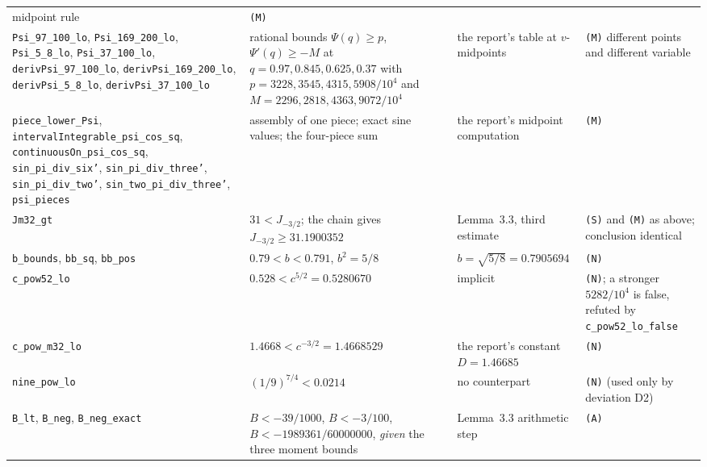 \documentclass[11pt]{article}
\newcommand{\Ln}[1]{\texttt{#1}}
\newcommand{\No}{\texttt{(N)}}
\newcommand{\Sc}{\texttt{(S)}}
\newcommand{\Me}{\texttt{(M)}}
\newcommand{\As}{\texttt{(A)}}
\begin{document}
{\begin{longtable}{L{3.7cm}L{4.2cm}L{3.4cm}L{4.7cm}}
midpoint rule & \Me\\
\Ln{Psi\_\allowbreak{}97\_\allowbreak{}100\_\allowbreak{}lo}, \Ln{Psi\_\allowbreak{}169\_\allowbreak{}200\_\allowbreak{}lo}, \Ln{Psi\_\allowbreak{}5\_\allowbreak{}8\_\allowbreak{}lo}, \Ln{Psi\_\allowbreak{}37\_\allowbreak{}100\_\allowbreak{}lo},
\Ln{derivPsi\_\allowbreak{}97\_\allowbreak{}100\_\allowbreak{}lo}, \Ln{derivPsi\_\allowbreak{}169\_\allowbreak{}200\_\allowbreak{}lo}, \Ln{derivPsi\_\allowbreak{}5\_\allowbreak{}8\_\allowbreak{}lo},
\Ln{derivPsi\_\allowbreak{}37\_\allowbreak{}100\_\allowbreak{}lo} & rational bounds $\Psi(q)\ge p$, $\Psi'(q)\ge-M$ at
$q=0.97,0.845,0.625,0.37$ with $p=3228,3545,4315,5908/10^4$ and $M=2296,2818,4363,9072/10^4$ &
the report's table at $v$-midpoints & \Me{} different points and different variable\\
\Ln{piece\_\allowbreak{}lower\_\allowbreak{}Psi}, \Ln{intervalIntegrable\_\allowbreak{}psi\_\allowbreak{}cos\_\allowbreak{}sq},
\Ln{continuousOn\_\allowbreak{}psi\_\allowbreak{}cos\_\allowbreak{}sq}, \Ln{sin\_\allowbreak{}pi\_\allowbreak{}div\_\allowbreak{}six'}, \Ln{sin\_\allowbreak{}pi\_\allowbreak{}div\_\allowbreak{}three'},
\Ln{sin\_\allowbreak{}pi\_\allowbreak{}div\_\allowbreak{}two'}, \Ln{sin\_\allowbreak{}two\_\allowbreak{}pi\_\allowbreak{}div\_\allowbreak{}three'}, \Ln{psi\_\allowbreak{}pieces} & assembly of one
piece; exact sine values; the four-piece sum & the report's midpoint computation & \Me\\
\Ln{Jm32\_\allowbreak{}gt} & $31<J_{-3/2}$; the chain gives $J_{-3/2}\ge31.1900352$ & Lemma~3.3, third
estimate & \Sc{} and \Me{} as above; conclusion identical\\
\Ln{b\_\allowbreak{}bounds}, \Ln{bb\_\allowbreak{}sq}, \Ln{bb\_\allowbreak{}pos} & $0.79<b<0.791$, $b^2=5/8$ & $b=\sqrt{5/8}=0.7905694$
& \No\\
\Ln{c\_\allowbreak{}pow52\_\allowbreak{}lo} & $0.528<c^{5/2}=0.5280670$ & implicit & \No; a stronger $5282/10^4$ is false,
refuted by \Ln{c\_\allowbreak{}pow52\_\allowbreak{}lo\_\allowbreak{}false}\\
\Ln{c\_\allowbreak{}pow\_\allowbreak{}m32\_\allowbreak{}lo} & $1.4668<c^{-3/2}=1.4668529$ & the report's constant $D=1.46685$ & \No\\
\Ln{nine\_\allowbreak{}pow\_\allowbreak{}lo} & $(1/9)^{7/4}<0.0214$ & no counterpart & \No{} (used only by deviation D2)\\
\Ln{B\_\allowbreak{}lt}, \Ln{B\_\allowbreak{}neg}, \Ln{B\_\allowbreak{}neg\_\allowbreak{}exact} & $B<-39/1000$, $B<-3/100$,
$B<-1989361/60000000$, \emph{given} the three moment bounds & Lemma~3.3 arithmetic step & \As{}

\end{longtable}}
\end{document}
